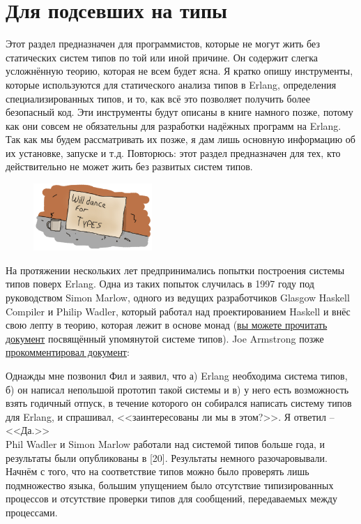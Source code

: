 \documentclass[a4paper,12pt]{report}
\begin{document}
\section{Для подсевших на типы}
Этот раздел предназначен для программистов, которые не могут жить без статических систем типов по той или иной причине. Он содержит слегка усложнённую теорию, которая не всем будет ясна. Я кратко опишу инструменты, которые используются для статического анализа типов в Erlang, определения специализированных типов, и то, как всё это позволяет получить более безопасный код. Эти инструменты будут описаны в книге намного позже, потому как они совсем не обязательны для разработки надёжных программ на Erlang. Так как мы будем рассматривать их позже, я дам лишь основную информацию об их установке, запуске и т.д. Повторюсь: этот раздел предназначен для тех, кто действительно не может жить без развитых систем типов.
\begin{figure}[h!]
    \includegraphics[width=0.4\textwidth]{type-dance.png}
\end{figure} 

На протяжении нескольких лет предпринимались попытки построения системы типов поверх Erlang. Одна из таких попыток случилась в 1997 году под руководством Simon Marlow, одного из ведущих разработчиков Glasgow Haskell Compiler и Philip Wadler, который работал над проектированием Haskell и внёс свою лепту в теорию, которая лежит в основе монад (\href{http://www.haskell.org/~simonmar/papers/erltc.pdf}{вы можете прочитать документ} посвящённый упомянутой системе типов). Joe Armstrong позже \href{http://www.cs.chalmers.se/Cs/Grundutb/Kurser/ppxt/HT2007/general/languages/armstrong-erlang\_history.pdf}{прокомментировал документ}:\\
\colorbox{lgray}
{
    \begin{minipage}{\linewidth}
Однажды мне позвонил Фил и заявил, что а) Erlang необходима система типов, б) он написал непольшой прототип такой системы и в) у него есть возможность взять годичный отпуск, в течение которого он собирался написать систему типов для Erlang, и спрашивал, <<заинтересованы ли мы в этом?>>. Я ответил \--- <<Да.>>\\
Phil Wadler и Simon Marlow работали над системой типов больше года, и результаты были опубликованы в [20]. Результаты немного разочаровывали. Начнём с того, что на соответствие типов можно было проверять лишь подмножество языка, большим упущением было отсутствие типизированных процессов и отсутствие проверки типов для сообщений, передаваемых между процессами.
    \end{minipage}
}
\end{document}
